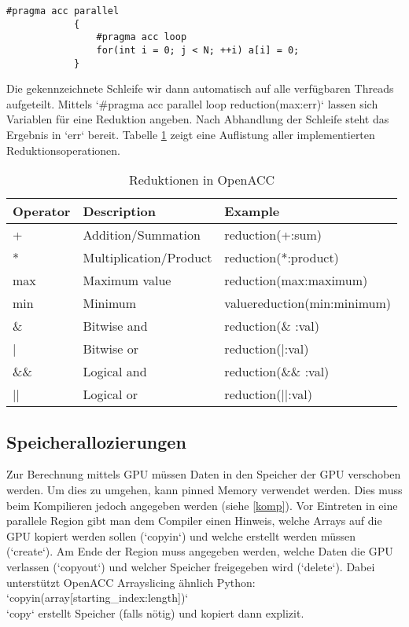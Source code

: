 			\begin{lstlisting}[caption=OpenACC: Loops]
			#pragma acc parallel
			{
				#pragma acc loop
				for(int i = 0; j < N; ++i) a[i] = 0;
			}
			\end{lstlisting}
			
			Die gekennzeichnete Schleife wir dann automatisch auf alle verfügbaren Threads aufgeteilt.
			Mittels \li`#pragma  acc parallel loop reduction(max:err)` lassen sich Variablen für eine Reduktion angeben. Nach Abhandlung der Schleife steht das Ergebnis in \li`err` bereit. Tabelle \ref{tab7:oaccred} zeigt eine Auflistung aller implementierten Reduktionsoperationen.
	
			\begin{table}[h]
			\centering
			\begin{tabular}{lll}
				\toprule
				\textbf{Operator} & \textbf{Description} & \textbf{Example} \\\midrule
				+ & Addition/Summation & reduction(+:sum) \\
				* & Multiplication/Product & reduction(*:product) \\
		 		max & Maximum value & reduction(max:maximum) \\
				min & Minimum & valuereduction(min:minimum) \\
				\& & Bitwise and & reduction(\& :val) \\
				| & Bitwise or & reduction(|:val) \\
				\&\& & Logical and & reduction(\&\& :val) \\
				|| & Logical or & reduction(||:val) \\\bottomrule
			\end{tabular}
			\caption{Reduktionen in OpenACC}
			\label{tab7:oaccred}
			\end{table}
		
			\subsection{Speicherallozierungen}
			Zur Berechnung mittels GPU müssen Daten in den Speicher der GPU verschoben werden. Um dies zu umgehen, kann pinned Memory verwendet werden. Dies muss beim Kompilieren jedoch angegeben werden (siehe \ref{komp}). Vor Eintreten in eine parallele Region gibt man dem Compiler einen Hinweis, welche Arrays auf die GPU kopiert werden sollen (\li`copyin`) und welche erstellt werden müssen (\li`create`). Am Ende der Region muss angegeben werden, welche Daten die GPU verlassen (\li`copyout`) und welcher Speicher freigegeben wird (\li`delete`). Dabei unterstützt OpenACC Arrayslicing ähnlich Python:\\
			\li`copyin(array[starting_index:length])`\\
			\li`copy` erstellt Speicher (falls nötig) und kopiert dann explizit.
			
